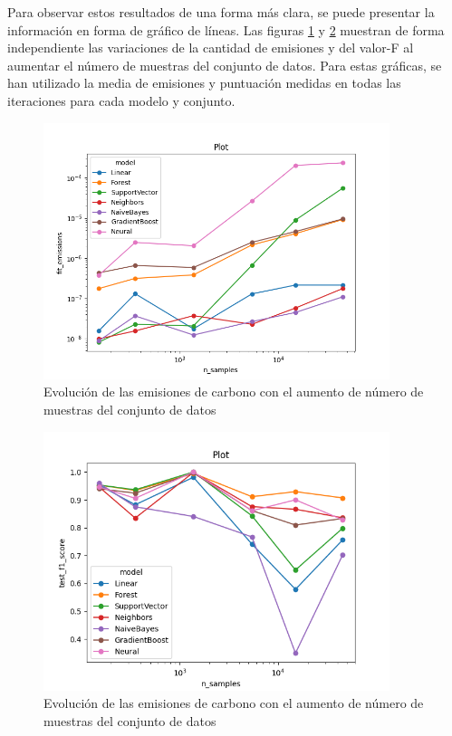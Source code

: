 

Para observar estos resultados de una forma más clara, se puede presentar la información en forma de gráfico de líneas. Las figuras \ref{fig:line-emissions-samples} y \ref{fig:line-fscore-samples} muestran de forma independiente las variaciones de la cantidad de emisiones y del valor-F al aumentar el número de muestras del conjunto de datos. Para estas gráficas, se han utilizado la media de emisiones y puntuación medidas en todas las iteraciones para cada modelo y conjunto.

\begin{figure}[H]
  \centerline{
     \includegraphics[width=0.9\textwidth, keepaspectratio]{img/graph/line-nsamples-emission-log.png}
  }
  \caption{Evolución de las emisiones de carbono con el aumento de número de muestras del conjunto de datos}
  \label{fig:line-emissions-samples}
\end{figure}
\begin{figure}[H]
  \centerline{
     \includegraphics[width=0.9\textwidth, keepaspectratio]{img/graph/line-nsamples-fscore-loglin.png}
  }
  \caption{Evolución de las emisiones de carbono con el aumento de número de muestras del conjunto de datos}
  \label{fig:line-fscore-samples}
\end{figure}

